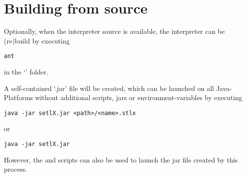 \section{Building from source}

Optionally, when the interpreter source is available, the interpreter can be (re)build by executing

\begin{lstlisting}[frame=none,numbers=none]
ant
\end{lstlisting}

in the `' folder.

A self-contained `.jar' file will be created, which can be launched on all Java-Platforms without additional scripts, jars or environment-variables by executing

\begin{lstlisting}[frame=none,numbers=none]
java -jar setlX.jar <path>/<name>.stlx
\end{lstlisting}

or

\begin{lstlisting}[frame=none,numbers=none]
java -jar setlX.jar
\end{lstlisting}

However, the  and  scripts can also be used to launch the jar file created by this process.

